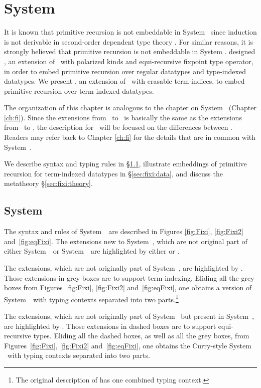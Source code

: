 \chapter{System \Fixi}\label{ch:fixi}

It is known that primitive recursion is not embeddable in System \F\ since
induction is not derivable in second-order dependent type theory
\cite{Geuvers01}. For similar reasons, it is strongly believed that
primitive recursion is not embeddable in System \Fw. 
\citet{AbeMat04} designed \Fixw, an extension of \Fw\ with polarized kinds and
equi-recursive fixpoint type operator, in order to embed primitive recursion
over regular datatypes and type-indexed datatypes.
We present \Fixi, an extension of \Fixw\ with erasable term-indices,
to embed primitive recursion over term-indexed datatypes.

The organization of this chapter is analogous to the chapter on System \Fi\
(Chapter \ref{ch:fi}). Since the extensions from \Fixw\ to \Fixi\ is
basically the same as the extensions from \Fw\ to \Fi,
the description for \Fixi\ will be focused on the differences between \Fi.
Readers may refer back to Chapter \ref{ch:fi} for the details that are
in common with System~\Fi.

We describe syntax and typing rules in \S\ref{sec:fixi:def},
illustrate embeddings of primitive recursion for term-indexed datatypes
in \S\ref{sec:fixi:data}, and discuss the metatheory \S\ref{sec:fixi:theory}.


\section{System \Fixi} \label{sec:fixi:def}
The syntax and rules of System~\Fi\ are described in
Figures \ref{fig:Fixi}, \ref{fig:Fixi2} and~\ref{fig:eqFixi}.
The extensions new to System~\Fixi, which are not original part of
either System~\Fw\ or System~\Fixw\ are highlighted by either
 or .

The extensions, which are not originally part of System~\Fixw, are highlighted
by \newFi{\text{grey boxes}}. Those extensions in grey boxes are to support
term indexing.  Eliding all the grey boxes from Figures~\ref{fig:Fixi},
\ref{fig:Fixi2} and~\ref{fig:eqFixi},
one obtains a version of System~\Fixw\ with typing contexts separated into
two parts.\footnote{The original description of \Fixw \cite{AbeMat04} has
one combined typing context.}

The extensions, which are not originally part of System \Fw\ but
present in System~\Fixw, are highlighted by \dbox{dashed boxes}.
Those extensions in dashed boxes are to support equi-recursive types. 
Eliding all the dashed boxes, as well as all the grey boxes,
from Figures~\ref{fig:Fixi}, \ref{fig:Fixi2} and~\ref{fig:eqFixi}, one obtains
the Curry-style System \Fw\ with typing contexts separated into two parts.


